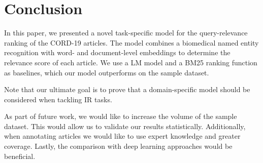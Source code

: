 \documentclass[10pt, a4paper]{article}
\begin{document}
	\section{Conclusion}
	
	In this paper, we presented a novel task-specific model for the query-relevance ranking of the CORD-19 articles. The model combines a biomedical named entity recognition with word- and document-level embeddings to determine the relevance score of each article. We use a LM model and a BM25 ranking function as baselines, which our model outperforms on the sample dataset.
	
	Note that our ultimate goal is to prove that a domain-specific model should be considered when tackling IR tasks.
	
	As part of future work, we would like to increase the volume of the sample dataset. This would allow us to validate our results statistically. Additionally, when annotating articles we would like to use expert knowledge and greater coverage. Lastly, the comparison with deep learning approaches would be beneficial.
	



\end{document}
